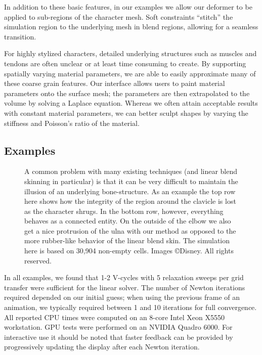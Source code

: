 In addition to these basic features, in our examples we allow our deformer to be applied to sub-regions of the character mesh. Soft constraints ``stitch'' the simulation region to the underlying mesh in blend regions, allowing for a seamless transition.  

For highly stylized characters, detailed underlying structures such as muscles and tendons are often unclear or at least time consuming to create. By supporting spatially varying material parameters, we are able to easily approximate many of these coarse grain features.  Our interface allows users to paint material parameters onto the surface mesh; the parameters are then extrapolated to the volume by solving a Laplace equation.  Whereas we often attain acceptable results with constant material parameters, we can better sculpt shapes by varying the stiffness and Poisson's ratio of the material.

\subsection{Examples}
\begin{figure}[tb]
\caption[A comparison with linear blend skinning on a character arm
  and shoulder.]{A common problem with many existing techniques (and linear blend
  skinning in particular) is that it can be very difficult to maintain the
  illusion of an underlying bone-structure. As an example the top row here shows
  how the integrity of the region around the clavicle is lost as the character
  shrugs. In the bottom row, however, everything behaves as a connected
  entity. On the outside of the elbow we also get a nice protrusion of the ulna
  with our method as opposed to the more rubber-like behavior of the linear
  blend skin. The simulation here is based on 30,904 non-empty cells. Images \copyright Disney. All rights reserved.}
\label{fig:thug}
\end{figure}
In all examples, we found that 1-2 V-cycles with 5 relaxation sweeps
per grid transfer were sufficient for the linear solver.  The number
of Newton iterations required depended on our initial guess; when
using the previous frame of an animation, we typically required
between 1 and 10 iterations for full convergence.  All reported CPU
times were computed on an 8-core Intel Xeon X5550 workstation.  GPU
tests were performed on an NVIDIA Quadro 6000. For interactive use it
should be noted that faster feedback can be provided by progressively
updating the display after each Newton iteration.

